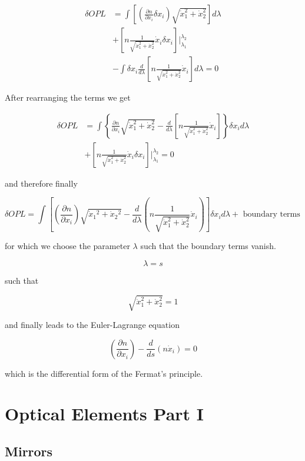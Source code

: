 \documentclass[
  a4paper,
]{book}
\begin{document}
\begin{tcolorbox}
\[
\begin{aligned}
\delta OPL &= \int \left[\left(\frac{\partial n}{\partial x_i} \delta x_i\right) \sqrt{\dot{x}_1^2+\dot{x}_2^2}\right] d\lambda \\
&+ \left[n \frac{1}{\sqrt{\dot{x}_1^2+\dot{x}_2^2}} \dot{x}_i \delta x_i\right]|_{\lambda_1}^{\lambda_2} \\
&- \int \delta x_i \frac{d}{d\lambda}\left[n \frac{1}{\sqrt{\dot{x}_1^2+\dot{x}_2^2}} \dot{x}_i\right] d\lambda = 0
\end{aligned}
\]

After rearranging the terms we get

\[
\begin{aligned}
\delta OPL &= \int \left\{\frac{\partial n}{\partial x_i} \sqrt{\dot{x}_1^2+\dot{x}_2^2} - \frac{d}{d\lambda}\left[n \frac{1}{\sqrt{\dot{x}_1^2+\dot{x}_2^2}} \dot{x}_i\right]\right\} \delta x_i d\lambda \\
&+ \left[n \frac{1}{\sqrt{\dot{x}_1^2+\dot{x}_2^2}} \dot{x}_i \delta x_i\right]|_{\lambda_1}^{\lambda_2} = 0
\end{aligned}
\]

and therefore finally

\[
\delta OPL=\int\left[\left(\frac{\partial n}{\partial x_i}\right) \sqrt{\dot{x}_1{ }^2+\dot{x}_2{ }^2}-\frac{d}{d \lambda}\left(n \frac{1}{\sqrt{\dot{x}_1^2+\dot{x}_2^2}} \dot{x}_i\right)\right] \delta x_i d \lambda+\text { boundary terms }
\]

for which we choose the parameter \(\lambda\) such that the boundary
terms vanish.

\[
\lambda=s
\]

such that

\[
\sqrt{\dot{x}_1^2+\dot{x}_2^2}=1
\]

and finally leads to the Euler-Lagrange equation

\[
\left(\frac{\partial n}{\partial x_i}\right)-\frac{d}{d s}\left(n \dot{x}_i\right)=0
\]

which is the differential form of the Fermat's principle.

\end{tcolorbox}

\chapter{Optical Elements Part I}\label{optical-elements-part-i}

\section{Mirrors}\label{mirrors}
\end{document}
